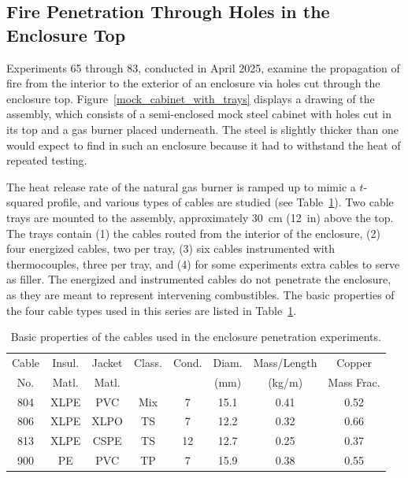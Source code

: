 \clearpage


\subsection{Fire Penetration Through Holes in the Enclosure Top}

Experiments 65 through 83, conducted in April 2025, examine the propagation of fire from the interior to the exterior of an enclosure via holes cut through the enclosure top. Figure~\ref{mock_cabinet_with_trays} displays a drawing of the assembly, which consists of a semi-enclosed mock steel cabinet with holes cut in its top and a gas burner placed underneath. The steel is slightly thicker than one would expect to find in such an enclosure because it had to withstand the heat of repeated testing.

The heat release rate of the natural gas burner is ramped up to mimic a $t$-squared profile, and various types of cables are studied (see Table~\ref{cables}). Two cable trays are mounted to the assembly, approximately 30~cm (12~in) above the top. The trays contain (1) the cables routed from the interior of the enclosure, (2) four energized cables, two per tray, (3) six cables instrumented with thermocouples, three per tray, and (4) for some experiments extra cables to serve as filler. The energized and instrumented cables do not penetrate the enclosure, as they are meant to represent intervening combustibles. The basic properties of the four cable types used in this series are listed in Table~\ref{cables}.

\begin{table}[ht]
\centering
\caption[Basic properties of cables]{Basic properties of the cables used in the enclosure penetration experiments.}
\label{cables}
\begin{tabular}{|c|c|c|c|c|c|c|c|}
\hline
Cable & Insul.  & Jacket  & Class.  & Cond.  & Diam.  & Mass/Length & Copper     \\
No.   & Matl.   & Matl.   &         &        & (mm)   & (kg/m)      & Mass Frac. \\ \hline
804   & XLPE    & PVC     & Mix     & 7      & 15.1   & 0.41        & 0.52       \\ \hline
806   & XLPE    & XLPO    & TS      & 7      & 12.2   & 0.32        & 0.66       \\ \hline
813   & XLPE    & CSPE    & TS      & 12     & 12.7   & 0.25        & 0.37       \\ \hline
900   & PE      & PVC     & TP      & 7      & 15.9   & 0.38        & 0.55       \\ \hline
\end{tabular}
\end{table}

